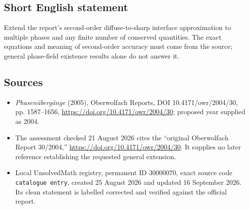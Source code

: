 \documentclass[11pt]{article}
\begin{document}
\subsection{Short English statement}
Extend the report's second-order diffuse-to-sharp interface approximation to multiple phases and any finite number of conserved quantities. The exact equations and meaning of second-order accuracy must come from the source; general phase-field existence results alone do not answer it.
\subsection{Sources}
\begin{itemize}
\item \emph{Phasen\"uberg\"ange} (2005), Oberwolfach Reports, DOI 10.4171/owr/2004/30, pp. 1587--1656, \url{https://doi.org/10.4171/owr/2004/30}; proposed year supplied as 2004.
\item The assessment checked 21 August 2026 cites the ``original Oberwolfach Report 30/2004,'' \url{https://doi.org/10.4171/owr/2004/30}. It supplies no later reference establishing the requested general extension.
\item Local UnsolvedMath registry, permanent ID $30000070$, exact source code \texttt{catalogue entry}, created 25 August 2026 and updated 16 September 2026. Its clean statement is labelled corrected and verified against the official report.
\end{itemize}
\end{document}
